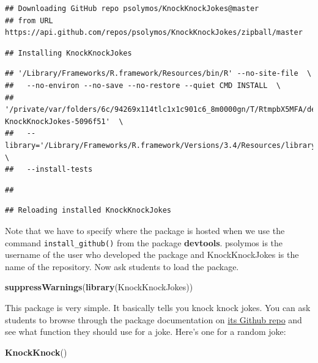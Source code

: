 \documentclass[]{book}
\newenvironment{Shaded}{\begin{snugshade}}{\end{snugshade}}
\newcommand{\KeywordTok}[1]{\textcolor[rgb]{0.13,0.29,0.53}{\textbf{#1}}}
\newcommand{\NormalTok}[1]{#1}
\begin{document}
\begin{verbatim}
## Downloading GitHub repo psolymos/KnockKnockJokes@master
## from URL https://api.github.com/repos/psolymos/KnockKnockJokes/zipball/master
\end{verbatim}

\begin{verbatim}
## Installing KnockKnockJokes
\end{verbatim}

\begin{verbatim}
## '/Library/Frameworks/R.framework/Resources/bin/R' --no-site-file  \
##   --no-environ --no-save --no-restore --quiet CMD INSTALL  \
##   '/private/var/folders/6c/94269x114tlc1x1c901c6_8m0000gn/T/RtmpbX5MFA/devtoolse28b25c4c2a6/psolymos-KnockKnockJokes-5096f51'  \
##   --library='/Library/Frameworks/R.framework/Versions/3.4/Resources/library'  \
##   --install-tests
\end{verbatim}

\begin{verbatim}
## 
\end{verbatim}

\begin{verbatim}
## Reloading installed KnockKnockJokes
\end{verbatim}

Note that we have to specify where the package is hosted when we use the command \texttt{install\_github()} from the package \textbf{devtools}. psolymos is the username of the user who developed the package and KnockKnockJokes is the name of the repository. Now ask students to load the package.

\begin{Shaded}
\begin{Highlighting}[]
\KeywordTok{suppressWarnings}\NormalTok{(}\KeywordTok{library}\NormalTok{(KnockKnockJokes))}
\end{Highlighting}
\end{Shaded}

This package is very simple. It basically tells you knock knock jokes. You can ask students to browse through the package documentation on \href{https://github.com/psolymos/KnockKnockJokes}{its Github repo} and see what function they should use for a joke. Here's one for a random joke:

\begin{Shaded}
\begin{Highlighting}[]
\KeywordTok{KnockKnock}\NormalTok{()}
\end{Highlighting}
\end{Shaded}
\end{document}
